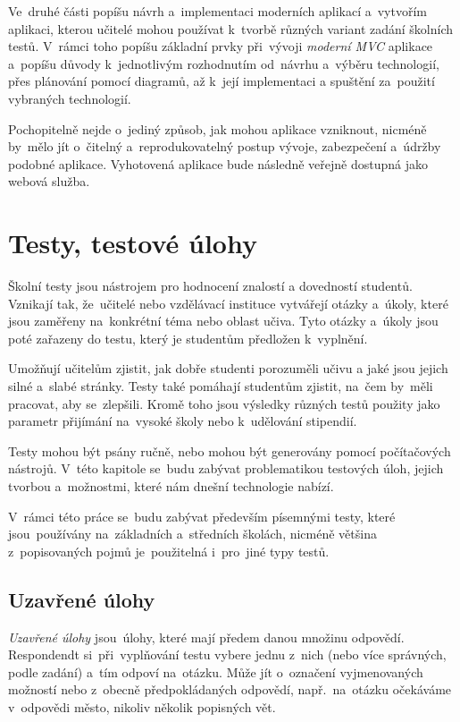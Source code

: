 \documentclass[14pt,a4paper]{article}
\begin{document}
    Ve~druhé části popíšu návrh a~implementaci moderních aplikací a~vytvořím aplikaci, kterou učitelé mohou používat k~tvorbě různých variant zadání školních testů. V~rámci toho popíšu základní prvky při~vývoji \emph{moderní \emph{MVC}} aplikace a~popíšu důvody k~jednotlivým rozhodnutím od~návrhu a~výběru technologií, přes plánování pomocí diagramů, až k~její implementaci a spuštění za~použití vybraných technologií.
    
    Pochopitelně nejde o~jediný způsob, jak mohou aplikace vzniknout, nicméně by~mělo jít o~čitelný a~reprodukovatelný postup vývoje, zabezpečení a~údržby podobné aplikace. Vyhotovená aplikace bude následně veřejně dostupná jako webová služba.

    \section{Testy, testové úlohy}

    Školní testy jsou nástrojem pro hodnocení znalostí a dovedností studentů. Vznikají tak, že~učitelé nebo vzdělávací instituce vytvářejí otázky a~úkoly, které jsou zaměřeny na~konkrétní téma nebo oblast učiva. Tyto otázky a~úkoly jsou poté zařazeny do testu, který je studentům předložen k~vyplnění.

    Umožňují učitelům zjistit, jak dobře studenti porozuměli učivu a jaké jsou jejich silné a~slabé stránky. Testy také pomáhají studentům zjistit, na~čem by~měli pracovat, aby se~zlepšili. Kromě toho jsou výsledky různých testů použity jako parametr přijímání na~vysoké školy nebo k~udělování stipendií.
    
    Testy mohou být psány ručně, nebo mohou být generovány pomocí počítačových nástrojů. V~této kapitole se~budu zabývat problematikou testových úloh, jejich tvorbou a~možnostmi, které nám dnešní technologie nabízí.

    V~rámci této práce se~budu zabývat především písemnými testy, které jsou~používány na~základních a~středních školách, nicméně většina z~popisovaných pojmů je~použitelná i~pro~jiné typy testů.

        \subsection{Uzavřené úlohy}
        
        \emph{Uzavřené úlohy} jsou~úlohy, které mají předem danou množinu odpovědí. Respondendt si~při~vyplňování testu vybere jednu z~nich (nebo více správných, podle zadání) a~tím odpoví na~otázku. Může jít o~označení vyjmenovaných možností nebo z~obecně předpokládaných odpovědí, např.~na~otázku  očekáváme v~odpovědi město, nikoliv několik popisných vět.
\end{document}
